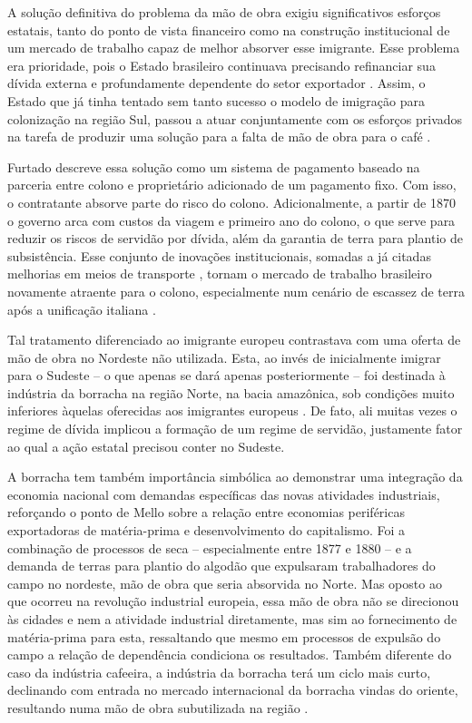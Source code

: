 A solução definitiva do problema da mão de obra exigiu significativos esforços estatais,
tanto do ponto de vista financeiro como na construção institucional de um mercado
de trabalho capaz de melhor absorver esse imigrante. Esse problema era prioridade, pois 
o Estado brasileiro
continuava precisando refinanciar sua dívida externa e profundamente
dependente do setor exportador
\citep{pradojunior2012}.
Assim, o Estado que já tinha tentado sem tanto sucesso o modelo de
imigração para colonização na região Sul, passou a atuar conjuntamente
com os esforços privados na tarefa de produzir uma solução para a falta
de mão de obra para o café
\citep{pradojunior2012}.

Furtado \citep{furtado2005} descreve essa solução como um sistema de pagamento baseado na
parceria entre colono e proprietário adicionado de um pagamento fixo.
Com isso, o contratante absorve parte do risco do colono. Adicionalmente, a partir de
1870 o governo arca com custos da viagem e primeiro ano do colono, o que
serve para reduzir os riscos de servidão por dívida, além da
garantia de terra para plantio de subsistência. Esse conjunto de
inovações institucionais, somadas a já citadas melhorias em meios de transporte
\citep{pradojunior2012},
tornam o mercado de trabalho brasileiro novamente atraente para o colono,
especialmente num cenário de escassez de terra após a unificação
italiana \citep{furtado2005}.

Tal tratamento diferenciado ao imigrante europeu contrastava com uma
oferta de mão de obra no Nordeste não utilizada. Esta, ao invés de
inicialmente imigrar para o Sudeste -- o que apenas se dará apenas
posteriormente -- foi destinada à indústria da borracha na região Norte,
na bacia amazônica, sob condições muito inferiores àquelas oferecidas
aos imigrantes europeus
\citep{furtado2005}. De
fato, ali muitas vezes o regime de dívida implicou a formação de um
regime de servidão, justamente fator ao qual a ação estatal precisou
conter no Sudeste.

A borracha tem também importância simbólica ao demonstrar uma integração
da economia nacional com demandas específicas das novas atividades
industriais, reforçando o ponto de Mello
\citep{mello1982} sobre a
relação entre economias periféricas exportadoras de matéria-prima e
desenvolvimento do capitalismo. Foi a combinação de processos de seca --
especialmente entre 1877 e 1880
\citep{furtado2005} -- e a 
demanda de terras para plantio do algodão que expulsaram trabalhadores
do campo no nordeste, mão de obra que seria absorvida no Norte. Mas
oposto ao que ocorreu na revolução industrial europeia, essa mão de obra
não se direcionou às cidades e nem a atividade industrial diretamente,
mas sim ao fornecimento de matéria-prima para esta, ressaltando que
mesmo em processos de expulsão do campo a relação de dependência
condiciona os resultados. Também diferente do caso da indústria
cafeeira, a indústria da borracha terá um ciclo mais curto, declinando com entrada no mercado
internacional da borracha vindas do oriente, resultando numa mão de
obra subutilizada na região
\citep{furtado2005}.

